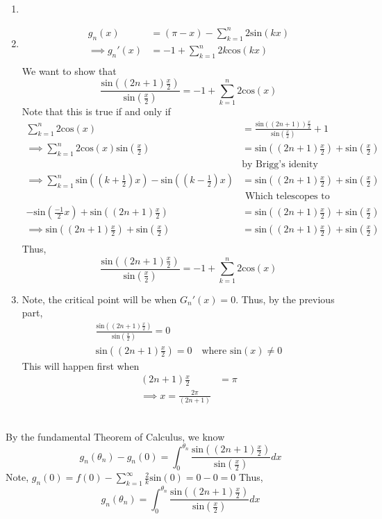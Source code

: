 \documentclass[letterpaper,12pt]{article}
\theoremstyle{definition}
\begin{document}
\\
\begin{enumerate}
    \item 
    \item
\begin{align*}
    g_n(x) &= (\pi - x) - \sum^{n}_{k=1} 2 \text{sin}(kx) \\
    \implies g_n'(x) &= -1 + \sum^{n}_{k=1} 2 k \text{cos}(kx) \\
\end{align*}
We want to show that 
    \[\frac{\text{sin} \left( (2n+1)\frac{x}{2} \right)}{\text{sin} (\frac{x}{2}) }  =-1 + \sum^{n}_{k=1} 2 \text{cos}(x)\]
Note that this is true if and only if 
\begin{align*}
     \sum^{n}_{k=1} 2 \text{cos}(x) & = \frac{\text{sin} \left( (2n+1) \right)\frac{x}{2} }{\text{sin} (\frac{x}{2}) } +1 \\
     \implies \sum^{n}_{k=1} 2 \text{cos}(x) \text{sin}(\frac{x}{2}) & = \text{sin}( (2n+1) \frac{x}{2}) + \text{sin}(\frac{x}{2}) \\
     &\text{by Brigg's idenity} \\
     \implies \sum^n_{k=1} \text{sin}( (k+\frac{1}{2})x) - \text{sin}( (k-\frac{1}{2})x) & =\text{sin}( (2n+1) \frac{x}{2}) + \text{sin}(\frac{x}{2}) \\
     &\text{ Which telescopes to} \\
     - \text{sin}(\frac{-1}{2}x)+ \text{sin}( (2n+1) \frac{x}{2}) & = \text{sin}( (2n+1) \frac{x}{2}) + \text{sin}(\frac{x}{2}) \\
     \implies \text{sin}( (2n+1) \frac{x}{2}) + \text{sin}(\frac{x}{2}) & = \text{sin}( (2n+1) \frac{x}{2}) + \text{sin}(\frac{x}{2}) \\
\end{align*}
Thus, 
    \[\frac{\text{sin} \left( (2n+1)\frac{x}{2} \right) }{\text{sin} (\frac{x}{2}) }  =-1 + \sum^{n}_{k=1} 2 \text{cos}(x)\]
    \item Note, the critical point will be when $G_n'(x) = 0$. Thus, by the previous part,
        \begin{align*}
            \frac{\text{sin} \left( (2n+1)\frac{x}{2} \right) }{\text{sin} (\frac{x}{2}) } = 0\\
            \text{sin} \left( (2n+1)\frac{x}{2} \right) = 0 \quad \text{where sin$(x)\neq 0$}
        \end{align*}
        This will happen first when 
        \begin{align*}
        (2n+1) \frac{x}{2} & = \pi\\
        \implies x = \frac{2\pi}{(2n+1)}
        \end{align*}
\end{enumerate}



\\
By the fundamental Theorem of Calculus, we know
\[
g_n(\theta_n) - g_n(0) = \int^{\theta_n}_0 \frac{\text{sin} \left( (2n+1)\frac{x}{2} \right)}{\text{sin} (\frac{x}{2})} dx
\]
Note, $g_n(0) = f(0) - \sum^\infty_{k=1} \frac{2}{k} \text{sin}(0) = 0 - 0 = 0$
Thus, 
\[
g_n(\theta_n) = \int^{\theta_n}_0 \frac{\text{sin} \left( (2n+1)\frac{x}{2} \right)}{\text{sin} (\frac{x}{2})} dx
\]
\end{document}

